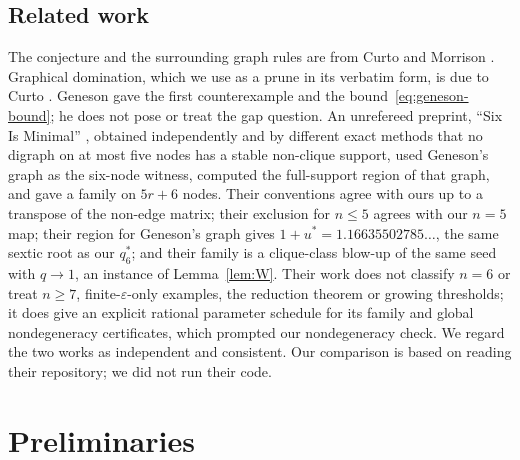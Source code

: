 \documentclass[11pt]{article}
\theoremstyle{definition}
\newcommand{\eps}{\varepsilon}
\begin{document}
\subsection{Related work}
The conjecture and the surrounding graph rules are from Curto and Morrison \cite{CurtoMorrison2023}.
Graphical domination, which we use as a prune in its verbatim form, is due to Curto \cite{Curto2025}.
Geneson \cite{Geneson2026} gave the first counterexample and the bound~\eqref{eq:geneson-bound}; he does
not pose or treat the gap question.
An unrefereed preprint, ``Six Is Minimal'' \cite{SixIsMinimal2026}, obtained independently and by
different exact methods that no digraph on at most five nodes has a stable non-clique support, used
Geneson's graph as the six-node witness, computed the full-support region of that graph, and gave a
family on $5r+6$ nodes. Their conventions agree with ours up to a transpose of the non-edge matrix; their
exclusion for $n\le5$ agrees with our $n=5$ map; their region for Geneson's graph gives
$1+u^*=1.16635502785\ldots$, the same sextic root as our $q_6^*$; and their family is a clique-class
blow-up of the same seed with $q\to1$, an instance of Lemma~\ref{lem:W}. Their work does not classify
$n=6$ or treat $n\ge7$, finite-$\eps$-only examples, the reduction theorem or growing thresholds; it does
give an explicit rational parameter schedule for its family and global nondegeneracy certificates, which
prompted our nondegeneracy check. We regard the two works as independent and consistent.
Our comparison is based on reading their repository; we did not run their code.

\section{Preliminaries}\label{sec:prelim}
\end{document}
